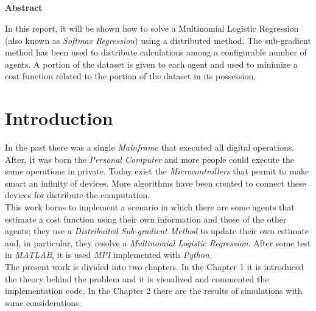 \documentclass[a4paper,11pt,oneside]{book}
\begin{document}
\pagestyle{myheadings}



\newpage
\thispagestyle{empty}

\begin{center}
\chapter*{}
\thispagestyle{empty}
{\Huge \textbf{Abstract}}\\
\vspace{15mm}
\end{center}
In this report, it will be shown how to solve a Multinomial Logistic Regression (also known as \textit{Softmax Regression}) using a distributed method. The sub-gradient method has been used to distribute calculations among a configurable number of agents. A portion of the dataset is given to each agent and used to minimize a cost function related to the portion of the dataset in its possession.


\tableofcontents \thispagestyle{empty}
\listoffigures\thispagestyle{empty}

\chapter*{Introduction}
In the past there was a single \textit{Mainframe} that executed all digital operations. After, it was born the \textit{Personal Computer} and more people could execute the same operations in private. Today exist the \textit{Microcontrollers} that permit to make smart an infinity of devices. More algorithms have been created to connect these devices for distribute the computation.\\
This work borns to implement a scenario in which there are some agents that estimate a cost function using their own information and those of the other agents; they use a \textit{Distribuited Sub-gradient Method} to update their own estimate and, in particular, they resolve a \textit{Multinomial Logistic Regression}. After some test in \textit{MATLAB}, it is used \textit{MPI} implemented with \textit{Python}.\\
The present work is divided into two chapters. In the Chapter 1 it is introduced the theory behind the problem and it is visualized and commented the implementation code. In the Chapter 2 there are the results of simulations with some considerations.
\end{document}
